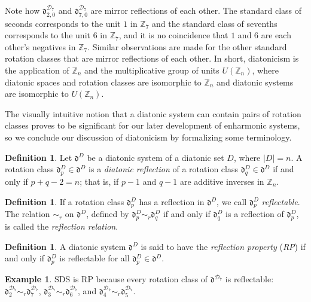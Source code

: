 \documentclass{article}
\theoremstyle{plain}
\theoremstyle{definition}
\newtheorem{definition}[theorem]{Definition}
\newtheorem{example}[theorem]{Example}
\theoremstyle{remark}
\begin{document}
Note how $\mathfrak{d}_{2,0}^{\mathcal{D}_7}$ and $\mathfrak{d}_{7,0}^{\mathcal{D}_7}$ are mirror reflections of each other. The standard class of seconds corresponds to the unit $1$ in $\mathbb{Z}_7$ and the standard class of sevenths corresponds to the unit $6$ in $\mathbb{Z}_7$, and it is no coincidence that $1$ and $6$ are each other's negatives in $\mathbb{Z}_7$. Similar observations are made for the other standard rotation classes that are mirror reflections of each other. In short, diatonicism is the application of $\mathbb{Z}_n$ and the multiplicative group of units $U(\mathbb{Z}_n)$, where diatonic spaces and rotation classes are isomorphic to $\mathbb{Z}_n$ and diatonic systems are isomorphic to $U(\mathbb{Z}_n)$.
	
The visually intuitive notion that a diatonic system can contain  pairs of rotation classes proves to be significant for our later development of enharmonic systems, so we conclude our discussion of diatonicism by formalizing some terminology.

\begin{definition}
\label{DEF.Diatonic Reflection}
	Let $\mathfrak{d}^D$ be a diatonic system of a diatonic set $D$, where $|D|=n$. A rotation class $\mathfrak{d}_p^D\in\mathfrak{d}^D$ is a \textit{diatonic reflection} of a rotation class $\mathfrak{d}_q^D\in\mathfrak{d}^D$ if and only if $p+q-2=n$; that is, if $p-1$ and $q-1$ are additive inverses in $\mathbb{Z}_n$.
\end{definition}

\begin{definition}
\label{DEF.Reflectable}
	If a rotation class $\mathfrak{d}_p^D$ has a reflection in $\mathfrak{d}^D$, we call $\mathfrak{d}_p^D$ \textit{reflectable}. The relation $\sim_r$ on $\mathfrak{d}^D$, defined by $\mathfrak{d}_p^D\sim_r\mathfrak{d}_q^D$ if and only if $\mathfrak{d}_q^D$ is a reflection of $\mathfrak{d}_p^D$, is called the \textit{reflection relation}.
\end{definition}

\begin{definition}
\label{DEF.Reflection Property}
	A diatonic system $\mathfrak{d}^D$ is said to have the \textit{reflection property} (\textit{RP}) if and only if $\mathfrak{d}_p^D$ is reflectable for all $\mathfrak{d}_p^D\in\mathfrak{d}^D$.
\end{definition}

\begin{example}
	SDS is RP because every rotation class of $\mathfrak{d}^{\mathcal{D}_7}$ is reflectable: $\mathfrak{d}_2^{\mathcal{D}_7}\sim_r\mathfrak{d}_7^{\mathcal{D}_7}$, $\mathfrak{d}_3^{\mathcal{D}_7}\sim_r\mathfrak{d}_6^{\mathcal{D}_7}$, and $\mathfrak{d}_4^{\mathcal{D}_7}\sim_r\mathfrak{d}_5^{\mathcal{D}_7}$.
\end{example}
\end{document}
